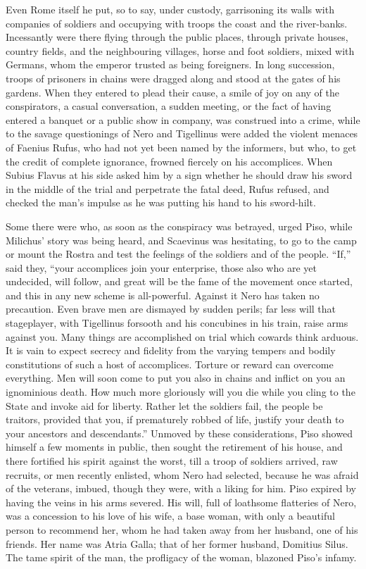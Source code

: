 
Even Rome itself he put, so to say, under custody, garrisoning its walls with companies of soldiers and occupying with troops the coast and the river-banks. Incessantly were there flying through the public places, through private houses, country fields, and the neighbouring villages, horse and foot soldiers, mixed with Germans, whom the emperor trusted as being foreigners. In long succession, troops of prisoners in chains were dragged along and stood at the gates of his gardens. When they entered to plead their cause, a smile of joy on any of the conspirators, a casual conversation, a sudden meeting, or the fact of having entered a banquet or a public show in company, was construed into a crime, while to the savage questionings of Nero and Tigellinus were added the violent menaces of Faenius Rufus, who had not yet been named by the informers, but who, to get the credit of complete ignorance, frowned fiercely on his accomplices. When Subius Flavus at his side asked him by a sign whether he should draw his sword in the middle of the trial and perpetrate the fatal deed, Rufus refused, and checked the man's impulse as he was putting his hand to his sword-hilt.


Some there were who, as soon as the conspiracy was betrayed, urged Piso, while Milichus' story was being heard, and Scaevinus was hesitating, to go to the camp or mount the Rostra and test the feelings of the soldiers and of the people. ``If,'' said they, ``your accomplices join your enterprise, those also who are yet undecided, will follow, and great will be the fame of the movement once started, and this in any new scheme is all-powerful. Against it Nero has taken no precaution. Even brave men are dismayed by sudden perils; far less will that stageplayer, with Tigellinus forsooth and his concubines in his train, raise arms against you. Many things are accomplished on trial which cowards think arduous. It is vain to expect secrecy and fidelity from the varying tempers and bodily constitutions of such a host of accomplices. Torture or reward can overcome everything. Men will soon come to put you also in chains and inflict on you an ignominious death. How much more gloriously will you die while you cling to the State and invoke aid for liberty. Rather let the soldiers fail, the people be traitors, provided that you, if prematurely robbed of life, justify your death to your ancestors and descendants.'' Unmoved by these considerations, Piso showed himself a few moments in public, then sought the retirement of his house, and there fortified his spirit against the worst, till a troop of soldiers arrived, raw recruits, or men recently enlisted, whom Nero had selected, because he was afraid of the veterans, imbued, though they were, with a liking for him. Piso expired by having the veins in his arms severed. His will, full of loathsome flatteries of Nero, was a concession to his love of his wife, a base woman, with only a beautiful person to recommend her, whom he had taken away from her husband, one of his friends. Her name was Atria Galla; that of her former husband, Domitius Silus. The tame spirit of the man, the profligacy of the woman, blazoned Piso's infamy.

